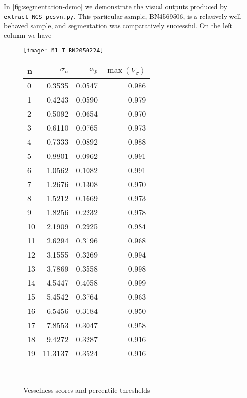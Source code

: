 In \cref{fig:segmentation-demo} we demonstrate the visual outputs produced by \texttt{extract\_NCS\_pcsvn.py}. This particular sample, BN4569506, is a relatively well-behaved sample, and segmentation was comparatively successful. On the left column we have 


\begin{figure}
	\begin{minipage}[tp]{0.5\textwidth}
		\texttt{[image: M1-T-BN2050224]}
	\end{minipage}
	\quad
	\begin{minipage}[tp]{0.35\textwidth}
		\begin{tabular}{l|r|r|r}
			n  & $\sigma_n$  &  $\alpha_p$  &  $\max(V_\sigma)$ \\
			\hline
			0  &   0.3535 &  0.0547 &  0.986\\
			1  &   0.4243 &  0.0590 &  0.979\\
			2  &   0.5092 &  0.0654 &  0.970\\
			3  &   0.6110 &  0.0765 &  0.973\\
			4  &   0.7333 &  0.0892 &  0.988\\
			5  &   0.8801 &  0.0962 &  0.991\\
			6  &   1.0562 &  0.1082 &  0.991\\
			7  &   1.2676 &  0.1308 &  0.970\\
			8  &   1.5212 &  0.1669 &  0.973\\
			9  &   1.8256 &  0.2232 &  0.978\\
			10 &   2.1909 &  0.2925 &  0.984\\
			11 &   2.6294 &  0.3196 &  0.968\\
			12 &   3.1555 &  0.3269 &  0.994\\
			13 &   3.7869 &  0.3558 &  0.998\\
			14 &   4.5447 &  0.4058 &  0.999\\
			15 &   5.4542 &  0.3764 &  0.963\\
			16 &   6.5456 &  0.3184 &  0.950\\
			17 &   7.8553 &  0.3047 &  0.958\\
			18 &   9.4272 &  0.3287 &  0.916\\
			19 &  11.3137 &  0.3524 &  0.916\\
		\end{tabular} \\
	\end{minipage}
	\caption{Vesselness scores and percentile thresholds}
\end{figure}

